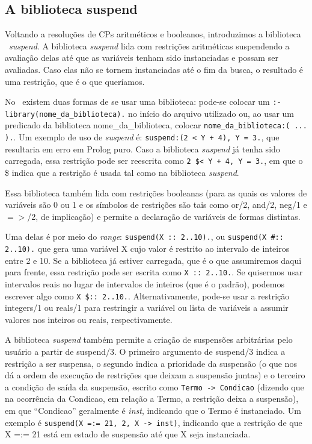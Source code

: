 \documentclass{article}
\begin{document}
\subsection{A biblioteca suspend}

Voltando a resoluções de CPs aritméticos e booleanos, introduzimos a biblioteca \eclipse\ \textit{suspend}. A biblioteca \textit{suspend} lida com restrições aritméticas suspendendo a avaliação delas até que as variáveis tenham sido instanciadas e possam ser avaliadas. Caso elas não se tornem instanciadas até o fim da busca, o resultado é uma restrição, que é o que queríamos.

No \eclipse\ existem duas formas de se usar uma biblioteca: pode-se colocar um {\tt :-library(nome\_da\_biblioteca).} no início do arquivo utilizado ou, ao usar um predicado da biblioteca nome\_da\_biblioteca, colocar {\tt nome\_da\_biblioteca:( ... ).}. Um exemplo de uso de \textit{suspend} é: {\tt suspend:(2 < Y + 4), Y = 3.}, que resultaria em erro em Prolog puro. Caso a biblioteca \textit{suspend} já tenha sido carregada, essa restrição pode ser reescrita como {\tt 2 \$< Y + 4, Y = 3.},
em que o \$ indica que a restrição é usada tal como na biblioteca \textit{suspend}.

Essa biblioteca também lida com restrições booleanas (para as quais os valores de variáveis são 0 ou 1 e os símbolos de restrições são tais como or/2, and/2, neg/1 e $=>$/2, de implicação) e permite a declaração de variáveis de formas distintas.

Uma delas é por meio do \textit{range}: {\tt suspend(X :: 2..10).}, ou {\tt suspend(X \#:: 2..10).}  %
que gera uma variável X cujo valor é restrito ao intervalo de inteiros entre 2 e 10. Se a biblioteca já estiver carregada, que é o que assumiremos daqui para frente, essa restrição pode ser escrita como {\tt X :: 2..10.}. %
Se quisermos usar intervalos reais no lugar de intervalos de inteiros (que é o padrão), podemos escrever algo como {\tt X \$:: 2..10.}.
Alternativamente, pode-se usar a restrição integers/1 ou reals/1 para restringir a variável ou lista de variáveis a assumir valores nos inteiros ou reais, respectivamente.



A biblioteca \textit{suspend} também permite a criação de suspensões arbitrárias pelo usuário a partir de suspend/3. O primeiro argumento de suspend/3 indica a restrição a ser suspensa, o segundo indica a prioridade da suspensão (o que nos dá a ordem de execução de restrições que deixam a suspensão juntas) e o terceiro a condição de saída da suspensão, escrito como {\tt Termo -> Condicao} (dizendo que na ocorrência da Condicao, em relação a Termo, a restrição deixa a suspensão), em que ``Condicao'' geralmente é \textit{inst}, indicando que o Termo é instanciado.
Um exemplo é {\tt suspend(X =:= 21, 2, X -> inst)}, indicando que a restrição de que X =:= 21 está em estado de suspensão até que X seja instanciada.
\end{document}
